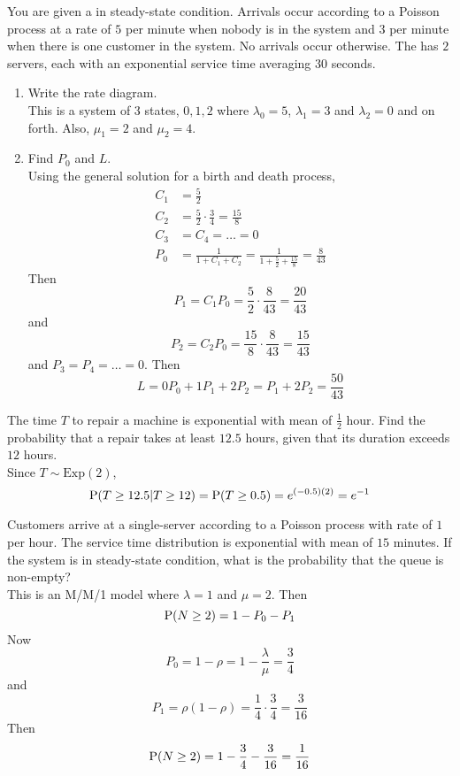 \documentclass[12pt]{article}
\begin{document}
\begin{question} You are given a \qs in steady-state condition. Arrivals occur according to a Poisson process at a rate of $5$ per minute when nobody is in the system and $3$ per minute when there is one customer in the system. No arrivals occur otherwise. The \qs has $2$ servers, each with an exponential service time averaging $30$ seconds. 
\begin{enumerate} 
\item Write the rate diagram. \\
This is a system of $3$ states, $0,1,2$ where $\lambda_0 = 5$, $\lambda_1 = 3$ and $\lambda_2 = 0$ and on forth. Also, $\mu_1=2$ and $\mu_2 = 4$. 
\item Find $P_0$ and $L$. \\ 
Using the general solution for a birth and death process, $$ \begin{aligned} C_1 &= \frac{5}{2} \\ C_2 &= \frac{5}{2} \cdot \frac{3}{4} = \frac{15}{8} \\ C_3 &= C_4 = \dots = 0 \\ P_0 &= \frac{1}{1 + C_1 + C_2} = \frac{1}{1 + \frac{5}{2} + \frac{15}{8}} = \frac{8}{43} \end{aligned} $$ Then $$ P_1 = C_1P_0 = \frac{5}{2} \cdot \frac{8}{43} = \frac{20}{43}$$ and $$P_2 = C_2P_0 = \frac{15}{8} \cdot \frac{8}{43} = \frac{15}{43} $$ and $P_3 = P_4 = \dots = 0$. Then $$ L = 0P_0 + 1P_1 + 2P_2 = P_1 + 2P_2 = \frac{50}{43} $$ 
\end{enumerate} 
\end{question} 

\begin{question} The time $T$ to repair a machine is exponential with mean of $\frac{1}{2}$ hour. Find the probability that a repair takes at least $12.5$ hours, given that its duration exceeds $12$ hours. \\
Since $T \sim \text{Exp}(2)$, $$ \mathrm{P}( T \geq 12.5 | T  \geq 12 ) = \mathrm{P}( T \geq 0.5 ) = e^{(-0.5)(2)} = e^{-1} $$ 
\end{question} 

\begin{question} Customers arrive at a single-server \qs according to a Poisson process with rate of $1$ per hour. The service time distribution is exponential with mean of $15$ minutes. If the system is in steady-state condition, what is the probability that the queue is non-empty? \\
This is an M/M/1 model where $\lambda = 1$ and $\mu= 2$. Then $$ \mathrm{P}( N \geq 2 ) = 1 - P_0 - P_1 $$ 
Now $$ P_0 = 1 - \rho = 1 - \frac{\lambda}{\mu} = \frac{3}{4} $$ and $$ P_1 = \rho(1-\rho) = \frac{1}{4} \cdot \frac{3}{4} = \frac{3}{16} $$ 
Then $$ \mathrm{P}( N \geq 2 ) = 1 - \frac{3}{4} - \frac{3}{16} = \frac{1}{16} $$ 
\end{question} 
\end{document}
